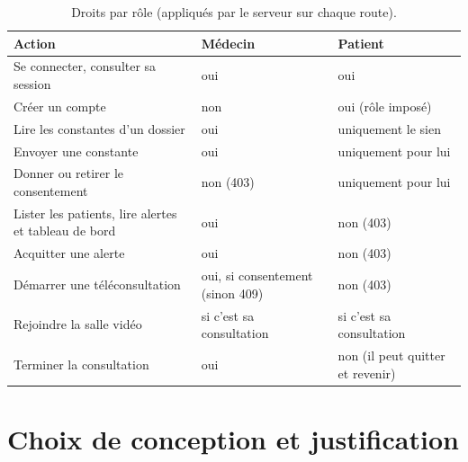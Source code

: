 \begin{table}[H]
\centering
\caption{Droits par rôle (appliqués par le serveur sur chaque route).}
\label{tab:droits}
\begin{tabular}{@{}p{5.4cm} >{\centering\arraybackslash}p{4.7cm} >{\centering\arraybackslash}p{4.7cm}@{}}
\toprule
\textbf{Action} & \textbf{Médecin} & \textbf{Patient} \\
\midrule
Se connecter, consulter sa session & oui & oui \\
Créer un compte & non & oui (rôle imposé) \\
Lire les constantes d'un dossier & oui & uniquement le sien \\
Envoyer une constante & oui & uniquement pour lui \\
Donner ou retirer le consentement & non (403) & uniquement pour lui \\
Lister les patients, lire alertes et tableau de bord & oui & non (403) \\
Acquitter une alerte & oui & non (403) \\
Démarrer une téléconsultation & oui, si consentement (sinon 409) & non (403) \\
Rejoindre la salle vidéo & si c'est sa consultation & si c'est sa consultation \\
Terminer la consultation & oui & non (il peut quitter et revenir) \\
\bottomrule
\end{tabular}
\end{table}

\section{Choix de conception et justification}

